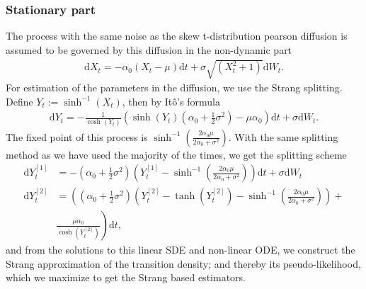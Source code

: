 \subsubsection{Stationary part}
The process with the same noise as the skew t-distribution pearson diffusion is assumed to be governed by this diffusion in the non-dynamic part
\begin{align}
    \mathrm{d}X_t = -\alpha_0\left(X_t - \mu\right)\mathrm{d}t + \sigma \sqrt{\left(X_t^2 + 1\right)}\mathrm{d}W_t.
\end{align}
For estimation of the parameters in the diffusion, we use the Strang splitting. Define $Y_t := \sinh^{-1}(X_t)$, then by Itô's formula
\begin{align}
    \mathrm{d}Y_t = - \frac{1}{\cosh(Y_t)}\left(\sinh(Y_t)\left(\alpha_0 + \frac{1}{2}\sigma^2\right) - \mu\alpha_0\right)\mathrm{d}t + \sigma \mathrm{d}W_t.
\end{align}
The fixed point of this process is $\sinh^{-1}(\frac{2\alpha_0\mu}{2\alpha_0 + \sigma^2})$. With the same splitting method as we have used the majority of the times, we get the splitting scheme
\begin{align}
    \mathrm{d}Y_t^{[1]} &= -\left(\alpha_0 + \frac{1}{2}\sigma^2\right)\left(Y_t^{[1]} - \sinh^{-1}\left(\frac{2\alpha_0\mu}{2\alpha_0 + \sigma^2}\right)\right)\mathrm{d}t + \sigma \mathrm{d}W_t \\
    \mathrm{d}Y_t^{[2]} &= \left(\left(\alpha_0 + \frac{1}{2}\sigma^2\right) \left(Y_t^{[2]} - \tanh\left(Y_t^{[2]}\right) - \sinh^{-1}\left(\frac{2\alpha_0\mu}{2\alpha_0 + \sigma^2}\right)\right) + \right. \nonumber \\
    &\left. \frac{\mu\alpha_0}{\cosh\left(Y_t^{[2]}\right)}\right)\mathrm{d}t, \label{eq:StrangTDiffusion}
\end{align}
and from the solutions to this linear SDE and non-linear ODE, we construct the Strang approximation of the transition density; and thereby its pseudo-likelihood, which we maximize to get the Strang based estimators.
